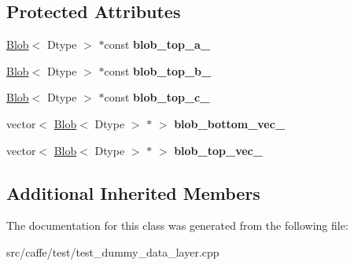 \subsection*{Protected Attributes}
\begin{DoxyCompactItemize}
\item 
\mbox{\label{classcaffe_1_1_dummy_data_layer_test_ab38d4bede90298df2e75802919bdb6af}} 
\mbox{\hyperlink{classcaffe_1_1_blob}{Blob}}$<$ Dtype $>$ $\ast$const {\bfseries blob\+\_\+top\+\_\+a\+\_\+}
\item 
\mbox{\label{classcaffe_1_1_dummy_data_layer_test_afed2b6789207cd8c45d0d8b8614cf673}} 
\mbox{\hyperlink{classcaffe_1_1_blob}{Blob}}$<$ Dtype $>$ $\ast$const {\bfseries blob\+\_\+top\+\_\+b\+\_\+}
\item 
\mbox{\label{classcaffe_1_1_dummy_data_layer_test_afedee0bc81ad1dd625658651859cfd7b}} 
\mbox{\hyperlink{classcaffe_1_1_blob}{Blob}}$<$ Dtype $>$ $\ast$const {\bfseries blob\+\_\+top\+\_\+c\+\_\+}
\item 
\mbox{\label{classcaffe_1_1_dummy_data_layer_test_abbd0a690ea18cf8ebd02272e43e849bc}} 
vector$<$ \mbox{\hyperlink{classcaffe_1_1_blob}{Blob}}$<$ Dtype $>$ $\ast$ $>$ {\bfseries blob\+\_\+bottom\+\_\+vec\+\_\+}
\item 
\mbox{\label{classcaffe_1_1_dummy_data_layer_test_a9792914580a67d67a22fe868ad04fe2e}} 
vector$<$ \mbox{\hyperlink{classcaffe_1_1_blob}{Blob}}$<$ Dtype $>$ $\ast$ $>$ {\bfseries blob\+\_\+top\+\_\+vec\+\_\+}
\end{DoxyCompactItemize}
\subsection*{Additional Inherited Members}


The documentation for this class was generated from the following file\+:\begin{DoxyCompactItemize}
\item 
src/caffe/test/test\+\_\+dummy\+\_\+data\+\_\+layer.\+cpp\end{DoxyCompactItemize}
